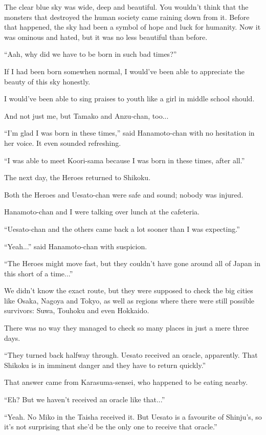 The clear blue sky was wide, deep and beautiful. You wouldn't think that the monsters that destroyed the human society came raining down from it. Before that happened, the sky had been a symbol of hope and luck for humanity. Now it was ominous and hated, but it was no less beautiful than before.

``Aah, why did we have to be born in such bad times?''

If I had been born somewhen normal, I would've been able to appreciate the beauty of this sky honestly.

I would've been able to sing praises to youth like a girl in middle school should.

And not just me, but Tamako and Anzu-chan, too...

``I'm glad I was born in these times,'' said Hanamoto-chan with no hesitation in her voice. It even sounded refreshing.

``I was able to meet Koori-sama because I was born in these times, after all.''

The next day, the Heroes returned to Shikoku.

Both the Heroes and Uesato-chan were safe and sound; nobody was injured.

Hanamoto-chan and I were talking over lunch at the cafeteria.

``Uesato-chan and the others came back a lot sooner than I was expecting.''

``Yeah...'' said Hanamoto-chan with suspicion.

``The Heroes might move fast, but they couldn't have gone around all of Japan in this short of a time...''

We didn't know the exact route, but they were supposed to check the big cities like Osaka, Nagoya and Tokyo, as well as regions where there were still possible survivors: Suwa, Touhoku and even Hokkaido.

There was no way they managed to check so many places in just a mere three days.

``They turned back halfway through. Uesato received an oracle, apparently. That Shikoku is in imminent danger and they have to return quickly.''

That answer came from Karasuma-sensei, who happened to be eating nearby.

``Eh? But we haven't received an oracle like that...''

``Yeah. No Miko in the Taisha received it. But Uesato is a favourite of Shinju's, so it's not surprising that she'd be the only one to receive that oracle.''

